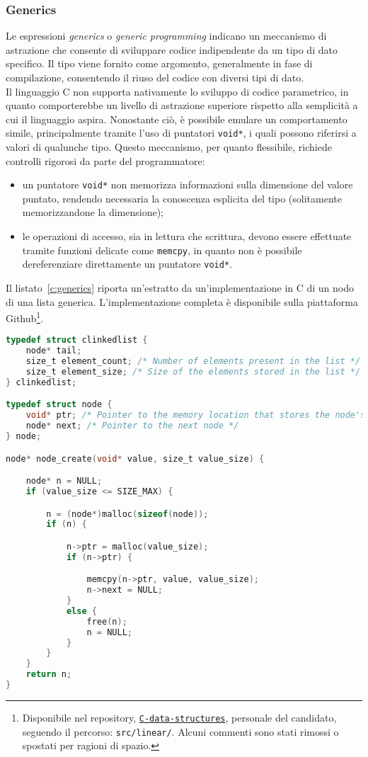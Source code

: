 \subsubsection{Generics}
Le espressioni \textit{generics} o \textit{generic programming} indicano un meccanismo di astrazione che consente di sviluppare codice indipendente da un tipo di dato specifico.
Il tipo viene fornito come argomento, generalmente in fase di compilazione, consentendo il riuso del codice con diversi tipi di dato. \hfill
\vspace{8pt}\\
\noindent Il linguaggio C non supporta nativamente lo sviluppo di codice parametrico, in quanto comporterebbe un livello di astrazione superiore rispetto alla
semplicità a cui il linguaggio aspira. Nonostante ciò, è possibile emulare un comportamento simile, principalmente tramite l'uso di puntatori \texttt{void*}, i quali possono riferirsi a valori di qualunche tipo.
Questo meccanismo, per quanto flessibile, richiede controlli rigorosi da parte del programmatore: 
\begin{itemize}
    \item un puntatore \texttt{void*} non memorizza informazioni sulla dimensione del valore puntato, rendendo necessaria la conoscenza esplicita del tipo (solitamente memorizzandone la dimensione);
    \item le operazioni di accesso, sia in lettura che scrittura, devono essere effettuate tramite funzioni delicate come \texttt{memcpy}, in quanto non è possibile dereferenziare direttamente un puntatore \texttt{void*}.
\end{itemize}
Il listato~\ref{c:generics} riporta un'estratto da un'implementazione in C di un nodo di una lista generica. L'implementazione completa è disponibile sulla piattaforma Github\cite{github-ds-repo}\footnote{Disponibile nel repository, \href{https://github.com/whocaresleft/C-data-structures}{\texttt{C-data-structures}}, personale del candidato, seguendo il percorso: \texttt{src/linear/}. Alcuni commenti sono stati rimossi o spostati per ragioni di spazio.}.
\begin{lstlisting}[language=C, float, caption={Programmazione generica in C}, label={c:generics}]
typedef struct clinkedlist {
	node* tail;
	size_t element_count; /* Number of elements present in the list */
	size_t element_size; /* Size of the elements stored in the list */
} clinkedlist;

typedef struct node {
	void* ptr; /* Pointer to the memory location that stores the node's value */
	node* next; /* Pointer to the next node */
} node;

node* node_create(void* value, size_t value_size) {

	node* n = NULL;
	if (value_size <= SIZE_MAX) {

		n = (node*)malloc(sizeof(node));
		if (n) {

			n->ptr = malloc(value_size);
			if (n->ptr) {

				memcpy(n->ptr, value, value_size);
				n->next = NULL;
			}
			else {
				free(n);
				n = NULL;
			}
		}
	}
	return n;
}
\end{lstlisting}
